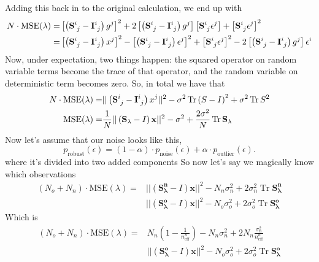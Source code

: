 \documentclass[11pt]{article}
\DeclareMathOperator{\Tr}{Tr}
\begin{document}
Adding this back in to the original calculation, we end up with
\begin{align}
    N \cdot \textrm{MSE}(\lambda)  =& \left[ \left(\mathbf{S}\indices{^i_j} -\mathbf{I}\indices{^i_j} \right) g^j \right]^2 + 2 \left[ \left(\mathbf{S}\indices{^i_j} -\mathbf{I}\indices{^i_j} \right) g^j \right]  \left[ \mathbf{S}\indices{^i_j} \epsilon^j \right]+ \left[ \mathbf{S}\indices{^i_j} \epsilon^j \right]^2 \\
    =&  \left[ \left(\mathbf{S}\indices{^i_j} -\mathbf{I}\indices{^i_j} \right)x^j \right]^2 - \left[ \left(\mathbf{S}\indices{^i_j} -\mathbf{I}\indices{^i_j} \right)\epsilon^j \right]^2 + \left[ \mathbf{S}\indices{^i_j} \epsilon^j \right]^2 - 2 \left[ \left(\mathbf{S}\indices{^i_j} -\mathbf{I}\indices{^i_j} \right) g^j \right] \epsilon^i
\end{align}
Now, under expectation, two things happen: the squared operator on random variable terms become the trace of that operator, and the random variable on deterministic term becomes zero. So, in total we have that
\begin{align}
    N \cdot \textrm{MSE}(\lambda)  =& || \left(\mathbf{S}\indices{^i_j} -\mathbf{I}\indices{^i_j} \right)x^j ||^2 - \sigma^2 \Tr \left(S - I\right)^2 + \sigma^2 \Tr S^2 \\
    \textrm{MSE}(\lambda) =& \frac{1}{N} || \left( \mathbf{S_\lambda} - I \right) \mathbf{x} ||^2 - \sigma^2 + \frac{2 \sigma^2}{N}  \Tr \mathbf{S_\lambda}
\end{align}
Now let's assume that our noise looks like this,
\begin{equation}
\label{robust_pdf}
    p_{\textrm{robust}}(\epsilon) = (1-\alpha) \cdot p_{\textrm{noise}}(\epsilon) + \alpha \cdot  p_{\textrm{outlier}}(\epsilon).
\end{equation}
where it's divided into two added components So now let's say we magically know which observations
\begin{align}
    (N_o + N_n) \cdot  \textrm{MSE}(\lambda) =& || \left( \mathbf{S^n_\lambda} - I \right) \mathbf{x} ||^2 - N_n \sigma_n^2  + 2  \sigma_n^2  \Tr \mathbf{S^n_\lambda} \\
    & || \left( \mathbf{S^o_\lambda} - I \right) \mathbf{x} ||^2 -  N_o \sigma_o^2 + 2 \sigma_o^2  \Tr \mathbf{S^o_\lambda}
\end{align}
Which is
\begin{align}
    (N_o + N_n) \cdot  \textrm{MSE}(\lambda) =& N_n \left(1-\frac{1}{n^n_\textrm{eff}} \right) - N_n \sigma_n^2  + 2 N_n \frac{\sigma_n^2}{n^n_\textrm{eff}} \\
    & || \left( \mathbf{S^o_\lambda} - I \right) \mathbf{x} ||^2 -  N_o \sigma_o^2 + 2 \sigma_o^2  \Tr \mathbf{S^o_\lambda}
    \end{align}
\end{document}
